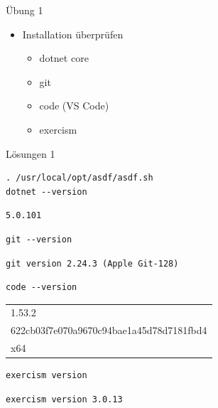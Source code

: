 \documentclass[t]{beamer}
\begin{document}
\begin{frame}[label={sec:org6d3f658}]{Übung 1}
\begin{itemize}
\item Installation überprüfen
\begin{itemize}
\item dotnet core
\item git
\item code (VS Code)
\item exercism
\end{itemize}
\end{itemize}
\end{frame}

\begin{frame}[label={sec:org608fece},fragile]{Lösungen 1}
 \scriptsize
\begin{verbatim}
. /usr/local/opt/asdf/asdf.sh
dotnet --version
\end{verbatim}

\begin{verbatim}
5.0.101
\end{verbatim}


\begin{verbatim}
git --version
\end{verbatim}

\begin{verbatim}
git version 2.24.3 (Apple Git-128)
\end{verbatim}



\begin{verbatim}
code --version
\end{verbatim}

\begin{tabular}{l}
1.53.2\\
622cb03f7e070a9670c94bae1a45d78d7181fbd4\\
x64\\
\end{tabular}

\begin{verbatim}
exercism version
\end{verbatim}

\begin{verbatim}
exercism version 3.0.13
\end{verbatim}
\end{frame}
\end{document}
